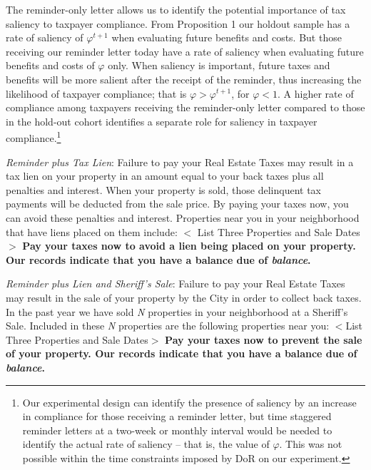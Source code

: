 \documentclass[12pt]{article}
\begin{document}
\bigskip

 The reminder-only letter allows us to identify the potential
 importance of tax saliency to taxpayer compliance.  From Proposition 1 our holdout sample has a rate of saliency of
 $\varphi^{t+1}$ when evaluating future benefits and costs.  But those
 receiving our reminder letter today have a rate of saliency when
 evaluating future benefits and costs of $\varphi$ only.  When
 saliency is important, future taxes and benefits will be more salient
 after the receipt of the reminder, thus increasing the likelihood of
 taxpayer compliance; that is $\varphi>\varphi^{t+1}$, for $\varphi<1$. A higher rate of compliance among taxpayers
 receiving the reminder-only letter compared to those in the hold-out
 cohort identifies a separate role for saliency in taxpayer
 compliance.\footnote{Our experimental design can identify the
   presence of saliency by an increase in compliance for those
   receiving a reminder letter, but time staggered reminder letters at
   a two-week or monthly interval would be needed to identify the
   actual rate of saliency -- that is, the value of $\varphi$.  This
   was not possible within the time constraints imposed by DoR on our
   experiment.  }
   
\bigskip

\noindent \textit{Reminder plus Tax Lien}: Failure to pay your Real
Estate Taxes may result in a tax lien on your property in an amount
equal to your back taxes plus all penalties and interest.  When your
property is sold, those delinquent tax payments will be deducted from
the sale price.  By paying your taxes now, you can avoid these
penalties and interest.  Properties near you in your neighborhood that
have liens placed on them include: $<$ List Three Properties and Sale
Dates $>$ \textbf{Pay your taxes now to avoid a lien being placed on
  your property.  Our records indicate that you have a balance due of
  \textit{balance}.  }

\bigskip

\noindent \textit{Reminder plus Lien and Sheriff's Sale}: Failure to
pay your Real Estate Taxes may result in the sale of your property by
the City in order to collect back taxes.  In the past year we have
sold \textit{N} properties in your neighborhood at a Sheriff's Sale.
Included in these \textit{N} properties are the following properties
near you: $<$List Three Properties and Sale Dates$>$ \textbf{Pay your
  taxes now to prevent the sale of your property.  Our records
  indicate that you have a balance due of \textit{balance}.}
\end{document}
